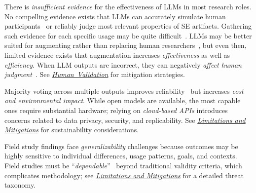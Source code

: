 \documentclass[smallextended]{svjour3}
\newcommand*{\enq}[1]{\enquote{{\itshape#1}}}
\newcommand{\humanvalidation}{\hyperref[sec:use-human-validation-for-llm-outputs]{\mbox{\emph{Human Validation}}}\xspace}
\newcommand{\limitationsmitigations}{\hyperref[sec:report-limitations-and-mitigations]{\emph{Limitations and Mitigations}}\xspace}
\newcommand{\humanvalidation}{\href{/guidelines/human-validation/}{\emph{Human Validation}}\xspace}
\newcommand{\limitationsmitigations}{\href{/guidelines/limitations/}{\emph{Limitations and Mitigations}}\xspace}
\begin{document}
There is \emph{insufficient evidence} for the effectiveness of LLMs in most research roles. No compelling evidence exists that LLMs can accurately simulate human participants~\cite{DBLP:journals/corr/abs-2508-06950} or reliably judge most relevant properties of SE artifacts. Gathering such evidence for each specific usage may be quite difficult~\cite{DBLP:journals/ais/HardingDLL24}. LLMs may be better suited for augmenting rather than replacing human researchers~\cite{DBLP:conf/emnlp/WangLXZZ21, DBLP:conf/chi/HeHDRH24}, but even then, limited evidence exists that augmentation increases \emph{effectiveness} as well as \emph{efficiency}. When LLM outputs are incorrect, they can negatively \emph{affect human judgment}~\cite{DBLP:conf/www/HuangKA23a}. See \humanvalidation for mitigation strategies.

Majority voting across multiple outputs improves reliability~\cite{DBLP:journals/corr/abs-2304-11085} but increases \emph{cost and environmental impact}. While open models are available, the most capable ones require substantial hardware; relying on \emph{cloud-based APIs} introduces concerns related to data privacy, security, and replicability. See \limitationsmitigations for sustainability considerations.

Field study findings face \emph{generalizability} challenges because outcomes may be highly sensitive to individual differences, usage patterns, goals, and contexts. Field studies must be \enq{dependable}~\cite{Sullivan2011-ub} beyond traditional validity criteria, which complicates methodology; see \limitationsmitigations for a detailed threat taxonomy.
\space%
\end{document}

